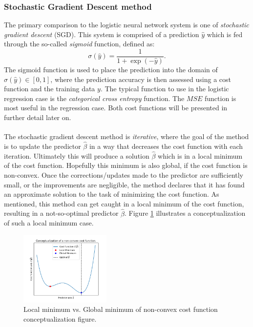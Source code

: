         \subsubsection{Stochastic Gradient Descent method}
            The primary comparison to the logistic neural network system is one of \textit{stochastic gradient descent} (SGD). This system is comprised of a prediction $\hat{y}$ which is fed through the so-called \textit{sigmoid} function, defined as:
            \begin{equation}\label{eq:sigmoid}
                \sigma (\hat{y}) = \frac{1}{1+\exp(-\hat{y})}.
            \end{equation}
            The sigmoid function is used to place the prediction into the domain of $\sigma(\hat{y}) \in [0,1]$, where the prediction accuracy is then assessed using a cost function and the training data %
            $y$. The typical function to use in the logistic regression case is the \textit{categorical cross entropy} function. The $MSE$ function is most useful in the regression case. Both cost functions will be presented in further detail later on.\\\\ 
            The stochastic gradient descent method is \textit{iterative}, where the goal of the method is to update the predictor $\hat{\beta}$ in a way that decreases the cost function with each iteration. 
            Ultimately this will produce a solution $\hat{\beta}$ which is in a local minimum of the cost function. Hopefully this minimum is also global, if the cost function is non-convex.
            Once the corrections/updates made to the predictor are sufficiently small, or the improvements are negligible, the method declares that it has found an approximate solution to the task of minimizing the cost function. As mentioned, this method can get caught in a local minimum of the cost function, resulting in a not-so-optimal predictor $\hat{\beta}$. Figure \ref{fig:local_min} illustrates a conceptualization of such a local minimum case.
            \begin{figure}[H]
                \centering
                \includegraphics[width=0.4\textwidth]{figures/local_min_concept.png}
                \caption{Local minimum vs. Global minimum of non-convex cost function conceptualization figure.}
                \label{fig:local_min}
            \end{figure}
